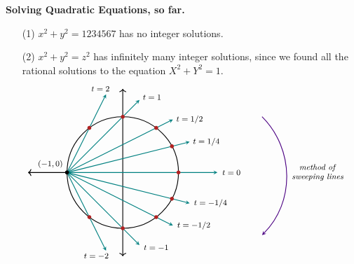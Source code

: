 \vspace*{2em}

{\bf Solving Quadratic Equations, so far.}
\begin{itemize}[itemsep = 2em]\label{quadeqex}
\item[(1)] $x^2 + y^2 = 1234567$ has no integer solutions.
\item[(2)] $x^2 + y^2 = z^2$ has infinitely many integer solutions, since we found all the rational solutions to the equation $X^2 + Y^2 = 1$.
\[\begin{tikzpicture}[scale=2]
    \draw[<-,thick] (-1.7,0)--(-1,0);
    \draw[<->,thick] (0,-1.5)--(0,1.5);
    \draw[thick](0,0) circle (1);
    \fill (-1,0) circle (1pt);
	\draw[->,thick,>=stealth, color=teal] (-1,0)--(-0.3,1.4); %
    \fill[color=firebrick] (-0.6,0.8) circle (1pt); %
    \draw[->,thick,>=stealth, color=teal] (-1,0)--(0.3,1.3); %
    \fill[color=firebrick] (0,1) circle (1pt); %
    \draw[->,thick,>=stealth, color=teal] (-1,0)--(0.9,0.95); %
    \fill[color=firebrick] (0.6,0.8) circle (1pt); %
    \draw[->,thick,>=stealth, color=teal] (-1,0)--(1.2,0.55); %
    \fill[color=firebrick] (0.882352941,0.470588235) circle (1pt); %
    \draw[->,thick,>=stealth, color=teal] (-1,0)--(1.7,0); %
    \fill[color=firebrick] (1,0) circle (1pt); %
	\draw[->,thick,>=stealth, color=teal] (-1,0)--(-0.3,-1.4); %
    \fill[color=firebrick] (-0.6,-0.8) circle (1pt); %
    \draw[->,thick,>=stealth, color=teal] (-1,0)--(0.3,-1.3); %
    \fill[color=firebrick] (0,-1) circle (1pt); %
    \draw[->,thick,>=stealth, color=teal] (-1,0)--(0.9,-0.95); %
    \fill[color=firebrick] (0.6,-0.8) circle (1pt); %
    \draw[->,thick,>=stealth, color=teal] (-1,0)--(1.2,-0.55); %
    \fill[color=firebrick] (0.882352941,-0.470588235) circle (1pt); %
    \fill (-1,0) circle (1pt);
	\node[] at (-1.3,0.15) {\footnotesize$(-1,0)$};
    \node[] at (-0.4,1.5) {\footnotesize $t=2$};
    \node[] at (-0.475,-1.5) {\footnotesize $t=-2$};
    \node[] at (0.525,1.35) {\footnotesize $t=1$};
    \node[] at (0.6,-1.35) {\footnotesize $t=-1$};
    \node[] at (1.2,0.95) {\footnotesize $t=1/2$};
    \node[] at (1.275,-0.95) {\footnotesize $t=-1/2$};
    \node[] at (1.5,0.55) {\footnotesize $t=1/4$};
    \node[] at (1.575,-0.55) {\footnotesize $t=-1/4$};
    \node[] at (1.95,0) {\footnotesize $t=0$};
	\draw[->,>=stealth,thick,color=indigo] (1.5,1) (2.5,1) arc(225:135:-1.5);
    \node[] at (3.5,0) {\footnotesize\begin{tabular}{c}\emph{method of}\\ \emph{sweeping lines}\end{tabular}};

\end{tikzpicture}\]
\end{itemize}
